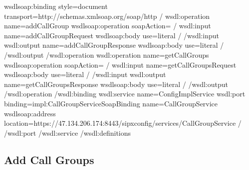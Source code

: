 \documentclass[letterpaper,10pt,english]{sphinxmanual}
\begin{document}
\begin{sphinxVerbatim}[commandchars=\\\{\}]
\PYGZlt{}wsdlsoap:binding style=\PYGZdq{}document\PYGZdq{} transport=\PYGZdq{}http://schemas.xmlsoap.org/soap/http\PYGZdq{} /\PYGZgt{}
\PYGZlt{}wsdl:operation name=\PYGZdq{}addCallGroup\PYGZdq{}\PYGZgt{}
\PYGZlt{}wsdlsoap:operation soapAction=\PYGZdq{}\PYGZdq{} /\PYGZgt{}
\PYGZlt{}wsdl:input name=\PYGZdq{}addCallGroupRequest\PYGZdq{}\PYGZgt{}
\PYGZlt{}wsdlsoap:body use=\PYGZdq{}literal\PYGZdq{} /\PYGZgt{}
\PYGZlt{}/wsdl:input\PYGZgt{}
\PYGZlt{}wsdl:output name=\PYGZdq{}addCallGroupResponse\PYGZdq{}\PYGZgt{}
\PYGZlt{}wsdlsoap:body use=\PYGZdq{}literal\PYGZdq{} /\PYGZgt{}
\PYGZlt{}/wsdl:output\PYGZgt{}
\PYGZlt{}/wsdl:operation\PYGZgt{}
\PYGZlt{}wsdl:operation name=\PYGZdq{}getCallGroups\PYGZdq{}\PYGZgt{}
\PYGZlt{}wsdlsoap:operation soapAction=\PYGZdq{}\PYGZdq{} /\PYGZgt{}
\PYGZlt{}wsdl:input name=\PYGZdq{}getCallGroupsRequest\PYGZdq{}\PYGZgt{}
\PYGZlt{}wsdlsoap:body use=\PYGZdq{}literal\PYGZdq{} /\PYGZgt{}
\PYGZlt{}/wsdl:input\PYGZgt{}
\PYGZlt{}wsdl:output name=\PYGZdq{}getCallGroupsResponse\PYGZdq{}\PYGZgt{}
\PYGZlt{}wsdlsoap:body use=\PYGZdq{}literal\PYGZdq{} /\PYGZgt{}
\PYGZlt{}/wsdl:output\PYGZgt{}
\PYGZlt{}/wsdl:operation\PYGZgt{}
\PYGZlt{}/wsdl:binding\PYGZgt{}
\PYGZlt{}wsdl:service name=\PYGZdq{}ConfigImplService\PYGZdq{}\PYGZgt{}
\PYGZlt{}wsdl:port binding=\PYGZdq{}impl:CallGroupServiceSoapBinding\PYGZdq{} name=\PYGZdq{}CallGroupService\PYGZdq{}\PYGZgt{}
\PYGZlt{}wsdlsoap:address location=\PYGZdq{}https://47.134.206.174:8443/sipxconfig/services/CallGroupService\PYGZdq{} /\PYGZgt{}
\PYGZlt{}/wsdl:port\PYGZgt{}
\PYGZlt{}/wsdl:service\PYGZgt{}
\PYGZlt{}/wsdl:definitions\PYGZgt{}
\end{sphinxVerbatim}


\subsection{Add Call Groups}
\label{\detokenize{soapapi:add-call-groups}}
\end{document}
